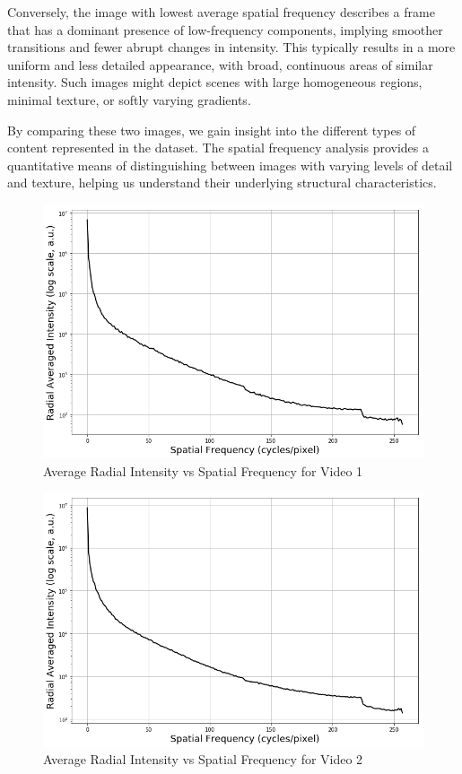 \documentclass{ioereport}
\begin{document}
Conversely, the image with lowest average spatial frequency describes a frame that has a dominant presence of low-frequency components, implying smoother transitions and fewer abrupt changes in intensity. This typically results in a more uniform and less detailed appearance, with broad, continuous areas of similar intensity. Such images might depict scenes with large homogeneous regions, minimal texture, or softly varying gradients.

By comparing these two images, we gain insight into the different types of content represented in the dataset. The spatial frequency analysis provides a quantitative means of distinguishing between images with varying levels of detail and texture, helping us understand their underlying structural characteristics.
    
\begin{figure}[H]
    \centering
    \includegraphics[width=\linewidth]{assets/video_radial_plots/very_very_short.png}
    \caption{Average Radial Intensity vs Spatial Frequency for Video 1}
    \label{fig:radial-plot-1}
\end{figure}


\begin{figure}[H]
    \centering
    \includegraphics[width=\linewidth]{assets/video_radial_plots/very_short.png}
    \caption{Average Radial Intensity vs Spatial Frequency for Video 2}
    \label{fig:radial-plot-2}
\end{figure}
\end{document}
